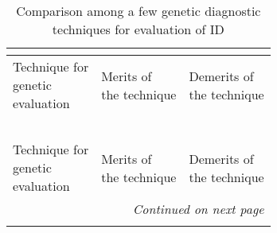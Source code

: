 \begin{longtable}{p{} p{} p{}}
    \caption{Comparison among a few genetic diagnostic techniques for evaluation of ID}\\
    \label{tab:techniqueevalid}\\
    \toprule
	\thead{Technique for\\ genetic\\ evaluation}
	    & \thead{Merits of\\ the technique}
	    & \thead{Demerits of\\ the technique}
	\\* \midrule
	\endfirsthead
	
	\toprule
	\multicolumn{3}{c}{\textsc{\tablename}~\thetable}\\
	\thead{Technique for\\ genetic\\ evaluation}
	    & \thead{Merits of\\ the technique}
	    & \thead{Demerits of\\ the technique}
	\\* \midrule
	\endhead
	
    \multicolumn{3}{r}{\textit{\small{Continued on next page}}}\\*
	\endfoot
    
    \bottomrule
  	\endlastfoot


\end{longtable}
